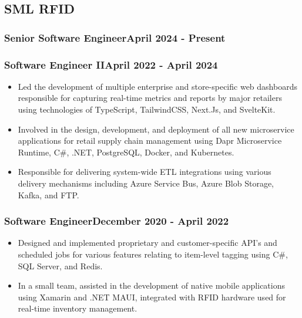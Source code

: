 
\newcommand\jobtitle[2]{
	\subsubsection*{\normalfont#1\hfill\normalfont#2}
}

\newcommand\position[4]{
	\subsection*{#1}
	\jobtitle{#2}{#3}
	#4
	\vspace{-0.25cm}
}


\position{SML RFID}{Senior Software Engineer}{April 2024 - Present}{
	\jobtitle{Software Engineer II}{April 2022 - April 2024}
	\begin{itemize}
		\item Led the development of multiple enterprise and store-specific web dashboards responsible for capturing real-time metrics and reports by major retailers using technologies of TypeScript, TailwindCSS, Next.Js, and SvelteKit.
		\item Involved in the design, development, and deployment of all new microservice applications for retail supply chain management using Dapr Microservice Runtime, C\#, .NET, PostgreSQL, Docker, and Kubernetes.
		\item Responsible for delivering system-wide ETL integrations using various delivery mechanisms including Azure Service Bus, Azure Blob Storage, Kafka, and FTP.
	\end{itemize}

	\jobtitle{Software Engineer}{December 2020 - April 2022}
	\begin{itemize}
		\item Designed and implemented proprietary and customer-specific API's and scheduled jobs for various features relating to item-level tagging using C\#, SQL Server, and Redis.
		\item In a small team, assisted in the development of native mobile applications using Xamarin and .NET MAUI, integrated with RFID hardware used for real-time inventory management.
	\end{itemize}
}

